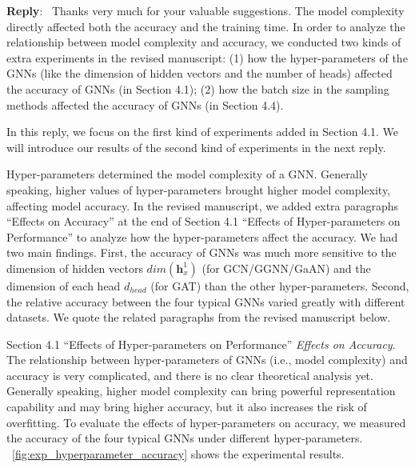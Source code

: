 \documentclass[12pt]{article}
\newcommand{\MyVec}[1]{\boldsymbol{#1}}
\newenvironment{myquote}[1]%
{\vspace{0.5em}\begin{zitat}{#1}}
{\end{zitat}\vspace{0.5em}}
\newenvironment{reply}
   {\medskip \noindent \textbf{Reply}:\  }
   {\medskip}
\begin{document}
\begin{reply}
    Thanks very much for your valuable suggestions.
    The model complexity directly affected both the accuracy and the training time.
    In order to analyze the relationship between model complexity and accuracy, we conducted two kinds of extra experiments in the revised manuscript: (1) how the hyper-parameters of the GNNs (like the dimension of hidden vectors and the number of heads) affected the accuracy of GNNs (in Section 4.1); (2) how the batch size in the sampling methods affected the accuracy of GNNs (in Section 4.4).

    In this reply, we focus on the first kind of experiments added in Section 4.1.
    We will introduce our results of the second kind of experiments in the next reply.

    Hyper-parameters determined the model complexity of a GNN.
    Generally speaking, higher values of hyper-parameters brought higher model complexity, affecting model accuracy.
    In the revised manuscript, we added extra paragraphs ``Effects on Accuracy'' at the end of Section 4.1 ``Effects of Hyper-parameters on Performance'' to analyze how the hyper-parameters affect the accuracy.
    We had two main findings.
    First, the accuracy of GNNs was much more sensitive to the dimension of hidden vectors $dim(\MyVec{h}^1_x)$ (for GCN/GGNN/GaAN) and the dimension of each head $d_{head}$ (for GAT) than the other hyper-parameters.
    Second, the relative accuracy between the four typical GNNs varied greatly with different datasets.
    We quote the related paragraphs from the revised manuscript below.

    \begin{myquote}{Section 4.1 ``Effects of Hyper-parameters on Performance''}
    \emph{Effects on Accuracy}.
    The relationship between hyper-parameters of GNNs (i.e., model complexity) and accuracy is very complicated, and there is no clear theoretical analysis yet.
    Generally speaking, higher model complexity can bring powerful representation capability and may bring higher accuracy, but it also increases the risk of overfitting.
    To evaluate the effects of hyper-parameters on accuracy, we measured the accuracy of the four typical GNNs under different hyper-parameters.
    \figurename~\ref{fig:exp_hyperparameter_accuracy} shows the experimental results.
    

\end{myquote}
\end{reply}
\end{document}
